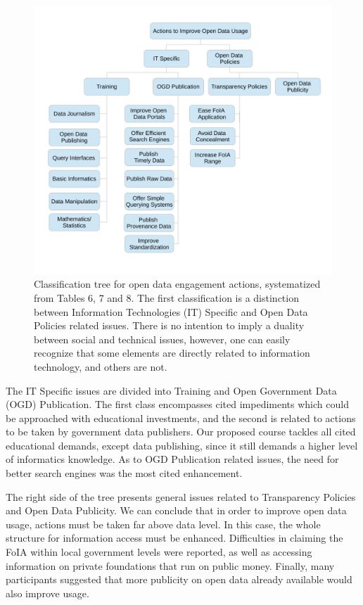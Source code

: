 \begin{figure}[h!]
\begin{center}
\includegraphics[width=\columnwidth]{images/impediments_classification.pdf}
\caption[Classification tree for open data engagement actions.]{Classification tree for open data engagement actions, systematized from Tables 6, 7 and 8.
The first classification is a distinction between Information Technologies (IT) Specific and Open Data Policies related issues. There is no intention to imply a duality between social and technical issues, however, one can easily recognize that some elements are directly related to information technology, and others are not.
}
\label{fig:dl_results}
\end{center}
\end{figure}


The IT Specific issues are divided into Training and Open Government Data (OGD) Publication. The first class encompasses cited impediments which could be approached with educational investments, and the second is related to actions to be taken by government data publishers. Our proposed course tackles all cited educational demands, except data publishing, since it still demands a higher level of informatics knowledge.  As to OGD Publication related issues, the need for better search engines was the most cited enhancement.

The right side of the tree presents general issues related to Transparency Policies and Open Data Publicity. We can conclude that in order to improve open data usage, actions must be taken far above data level. In this case, the whole structure for information access must be enhanced. Difficulties in claiming the FoIA within local government levels were reported, as well as accessing information on private foundations that run on public money. Finally, many participants suggested that more publicity on open data already available would also improve usage.

